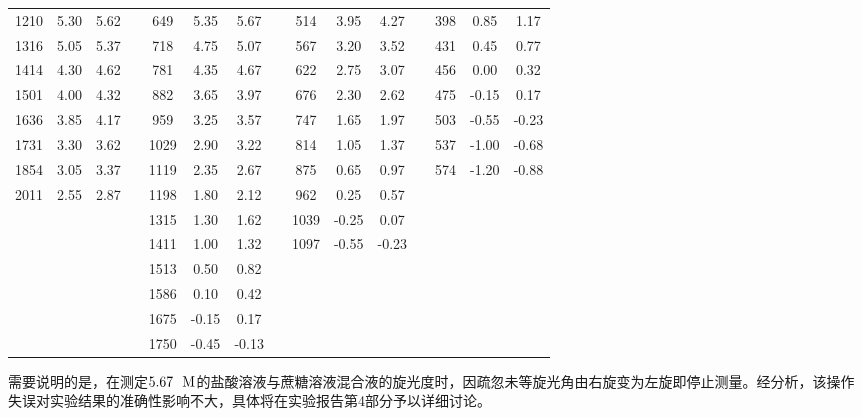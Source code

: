 \documentclass[12pt]{article}
\begin{document}
\begin{table}[h]
\begin{tabular}{ccccccccccccccc}
1210 & 5.30  & 5.62  & &649  & 5.35  & 5.67&  & 514  & 3.95  & 4.27 & & 398 & 0.85  & 1.17  \\
1316 & 5.05  & 5.37 & & 718  & 4.75  & 5.07 & & 567  & 3.20  & 3.52  & &431 & 0.45  & 0.77  \\
1414 & 4.30  & 4.62 & & 781  & 4.35  & 4.67&  & 622  & 2.75  & 3.07  & &456 & 0.00  & 0.32  \\
1501 & 4.00  & 4.32&  & 882  & 3.65  & 3.97 & & 676  & 2.30  & 2.62 & & 475 & -0.15 & 0.17  \\
1636 & 3.85  & 4.17 & & 959  & 3.25  & 3.57 & & 747  & 1.65  & 1.97 & & 503 & -0.55 & -0.23 \\
1731 & 3.30  & 3.62&  & 1029 & 2.90  & 3.22 & & 814  & 1.05  & 1.37 & & 537 & -1.00 & -0.68 \\
1854 & 3.05  & 3.37 & & 1119 & 2.35  & 2.67 & & 875  & 0.65  & 0.97 & & 574 & -1.20 & -0.88 \\
2011 & 2.55  & 2.87 & & 1198 & 1.80  & 2.12 & & 962  & 0.25  & 0.57  &     &       &    &   \\
&       &       & & 1315 & 1.30  & 1.62 & & 1039 & -0.25 & 0.07  &     &       &     &  \\
&       &       & & 1411 & 1.00  & 1.32 & & 1097 & -0.55 & -0.23 &     &       &      & \\
&       &     &  & 1513 & 0.50  & 0.82  &  & &    &       &       &     &       &       \\
&       &   &    & 1586 & 0.10  & 0.42  &      &       &       &     &      & &    &   \\
&       &    &   & 1675 & -0.15 & 0.17  &      &       &       &     &    & &   &       \\
&       &     &  & 1750 & -0.45 & -0.13 &      &       &       &     &       & & &     \\


 	\bottomrule
	\end{tabular}
\end{table}
\par 
需要说明的是，在测定$5.67\ \ {\rm M}$的盐酸溶液与蔗糖溶液混合液的旋光度时，因疏忽未等旋光角由右旋变为左旋即停止测量。经分析，该操作失误对实验结果的准确性影响不大，具体将在实验报告第4部分予以详细讨论。
\end{document}
